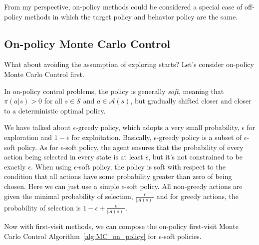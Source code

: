 From my perspective, on-policy methods could be considered a special case of off-policy methods in which the target policy and behavior policy are the same.

\subsection{On-policy Monte Carlo Control}

What about avoiding the assumption of exploring starts? Let's consider on-policy Monte Carlo Control first.

In on-policy control problems, the policy is generally \emph{soft}, meaning that $\pi(a|s) > 0$ for all $s \in \mathcal{S}$ and $a \in \mathcal{A}(s)$, but gradually shifted closer and closer to a deterministic optimal policy.

We have talked about $\epsilon$-greedy policy, which adopts a very small probability, $\epsilon$ for exploration and $1-\epsilon$ for exploitation. Basically, $\epsilon$-greedy policy is a subset of $\epsilon$-soft policy. As for $\epsilon$-soft policy, the agent ensures that the probability of every action being selected in every state is at least 
$\epsilon$, but it's not constrained to be exactly $\epsilon$. When using $\epsilon$-soft policy, the policy is soft with respect to the condition that all actions have some probability greater than zero of being chosen. Here we can just use a simple $\epsilon$-soft policy. All non-greedy actions are given the minimal probability of selection, $\frac{\epsilon}{|\mathcal{A}(s)|}$ and for greedy actions, the probability of selection is $1-\epsilon + \frac{\epsilon}{|\mathcal{A}(s)|}$.

Now with first-visit methods, we can compose the on-policy first-visit Monte Carlo Control Algorithm~\ref{alg:MC_on_policy} for $\epsilon$-soft policies.

